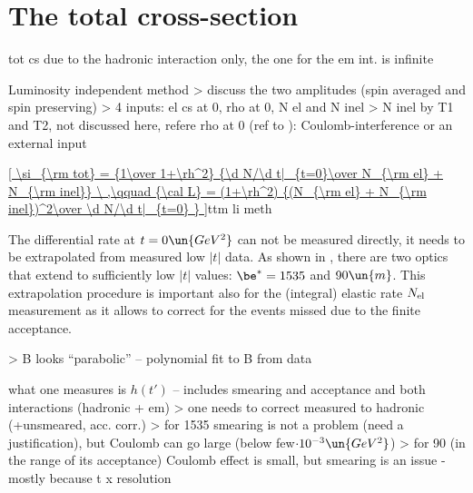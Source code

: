 \section{The total cross-section}

\> tot cs due to the hadronic interaction only, the one for the em int. is infinite

\> Luminosity independent method
\>> discuss the two amplitudes (spin averaged and spin preserving)
\>> 4 inputs: el cs at 0, rho at 0, N el and N inel
\>> N inel by T1 and T2, not discussed here, refere
\> rho at 0 (ref to ): Coulomb-interference or an external input

\eqref{
	\si_{\rm tot} = {1\over 1+\rh^2} {\d N/\d t|_{t=0}\over N_{\rm el} + N_{\rm inel}}
	\ ,\qquad
	{\cal L} = (1+\rh^2) {(N_{\rm el} + N_{\rm inel})^2\over \d N/\d t|_{t=0} }
}{ttm li meth}

The differential rate at $t=0\un{GeV^2}$ can not be measured directly, it needs to be extrapolated from measured low $|t|$ data. As shown in , there are two optics that extend to sufficiently low $|t|$ values: $\be^* = 1535$ and $90\un{m}$. This extrapolation procedure is important also for the (integral) elastic rate $N_{\rm el}$ measurement as it allows to correct for the events missed due to the finite acceptance.


\>> B looks ``parabolic'' -- polynomial fit to B from data

\iffalse
islam_bfkl, 9E-01, 3E-01, 2E-02, 1E-03, 3E-04
 islam_cgc, 9E-01, 3E-01, 2E-02, 1E-03, 3E-04
      ppp2, 6E-02, 4E-03, 1E-04, 3E-06, 1E-06
      ppp3, 8E-01, 2E-01, 4E-03, 4E-03, 2E-03
       bsw, 5E-01, 2E-01, 1E-03, 2E-04, 2E-04
        bh, 2E+00, 3E-01, 7E-03, 3E-03, 2E-03
      mean, 8E-01, 2E-01, 8E-03, 1E-03, 8E-04
\fi


\> what one measures is $h(t')$ -- includes smearing and acceptance and both interactions (hadronic + em)
\>> one needs to correct measured to hadronic (+unsmeared, acc. corr.)
\>> for 1535 smearing is not a problem (need a justification), but Coulomb can go large (below few$\cdot 10^{-3}\un{GeV^2}$)
\>> for 90 (in the range of its acceptance) Coulomb effect is small, but smearing is an issue - mostly because t x resolution

\bmfig
{}
\emfig

